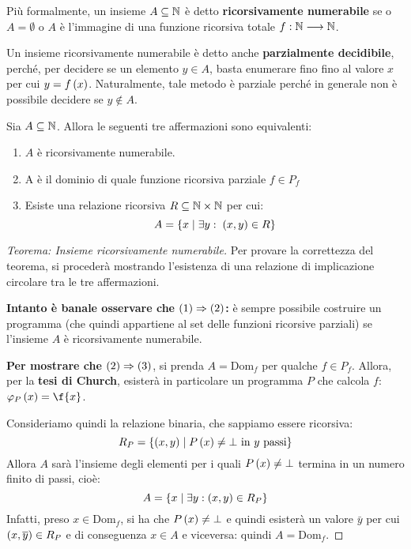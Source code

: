 \documentclass{lectures}
\begin{document}
\begin{multicols}{2}
\begin{definition}
    Più formalmente, un insieme \(A\subseteq \mathbb{N}\) è detto \textbf{ricorsivamente numerabile} se o \(A = \emptyset\) o \(A\) è l'immagine di una funzione ricorsiva totale \(f:\mathbb{N}\longrightarrow \mathbb{N}\). 
\end{definition}
\begin{definition}
    Un insieme ricorsivamente numerabile è detto anche \textbf{parzialmente decidibile}, perché, per decidere se un elemento \(y \in A\), basta enumerare fino fino al valore \(x\) per cui \(y = f\left(x\right)\). Naturalmente, tale metodo è parziale perché in generale non è possibile decidere se \(y\not\in A\).
\end{definition}
\begin{theorem}
    Sia \(A\subseteq\mathbb{N}\). Allora le seguenti tre affermazioni sono equivalenti:
    \begin{enumerate}
        \item \(A\) è ricorsivamente numerabile.
        \item A è il dominio di quale funzione ricorsiva parziale \(f \in P_f\)
        \item Esiste una relazione ricorsiva \(R\subseteq\mathbb{N}\times\mathbb{N}\) per cui:
        \[
            A = \left\{x\mid \exists y: \;\left(x,y\right) \in R\right\}
        \]
    \end{enumerate}
\end{theorem}
\begin{proof}[Teorema: Insieme ricorsivamente numerabile]
    Per provare la correttezza del teorema, si procederà mostrando l'esistenza di una relazione di implicazione circolare tra le tre affermazioni.
    
    \textbf{Intanto è banale osservare che \(\left(1\right)\Rightarrow\left(2\right)\):} è sempre possibile costruire un programma (che quindi appartiene al set delle funzioni ricorsive parziali) se l'insieme \(A\) è ricorsivamente numerabile.
    
    \textbf{Per mostrare che \(\left(2\right)\Rightarrow\left(3\right)\)}, si prenda \(A = \text{Dom}_f\) per qualche \(f \in P_f\). Allora, per la \textbf{tesi di Church}, esisterà in particolare un programma \(P\) che calcola \(f\): \(\varphi_P\rnd{x} = \f{x}\).
    
    Consideriamo quindi la relazione binaria, che sappiamo essere ricorsiva:
    \[
        R_P = \left\{\left(x,y\right) \mid P\left(x\right) \neq \bot \text{ in \(y\) passi}\right\}
    \]
    Allora \(A\) sarà l'insieme degli elementi per i quali \(P\left(x\right) \neq \bot\) termina in un numero finito di passi, cioè:
    \[
        A = \left\{x \mid \exists y: \left(x,y\right) \in R_P\right\}
    \]
    Infatti, preso \(x \in \text{Dom}_f\), si ha che \(P\left(x\right)\neq \bot\) e quindi esisterà un valore \(\bar{y}\) per cui \(\left(x,\overline{y}\right) \in R_P\) e di conseguenza \(x\in A\) e viceversa: quindi \(A = \text{Dom}_f\).
    

\end{proof}
\end{multicols}
\end{document}
